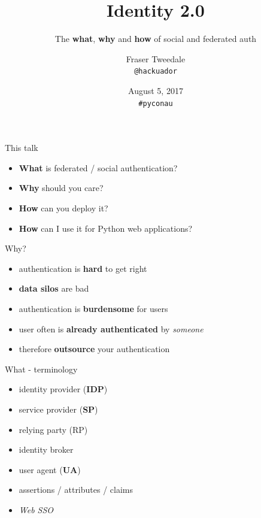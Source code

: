 \documentclass[ignorenonframetext,aspectratio=169]{beamer}
\title{\textbf{Identity 2.0}}
\subtitle{The {\bf what}, {\bf why} and {\bf how} of social and federated auth}
\author{
    Fraser Tweedale\\
    \texttt{@hackuador}\\
    \bigskip
    \def\svgwidth{2cm}
    
}
\date{August 5, 2017\\ {\tt \#pyconau}}
\providecommand{\tightlist}{%
  \setlength{\itemsep}{0pt}\setlength{\parskip}{0pt}}
\begin{document}
\frame{\titlepage}

\begin{frame}{This talk}

\begin{itemize}
\tightlist
\item
  \textbf{What} is federated / social authentication?
\item
  \textbf{Why} should you care?
\item
  \textbf{How} can you deploy it?
\item
  \textbf{How} can I use it for Python web applications?
\end{itemize}

\end{frame}

\begin{frame}{Why?}

\begin{itemize}
\tightlist
\item authentication is {\bf hard} to get right
\item {\bf data silos} are bad
\item authentication is {\bf burdensome} for users
\item user often is {\bf already authenticated} by {\em someone}
\item therefore \textbf{outsource} your authentication
\end{itemize}

\end{frame}

\begin{frame}{What - terminology}
\begin{itemize}
\tightlist
\item identity provider ({\bf IDP})
\item service provider ({\bf SP})
\item relying party (RP)
\item identity broker
\item user agent ({\bf UA})
\item assertions / attributes / claims
\item {\em Web SSO}
\end{itemize}
\end{frame}
\end{document}
